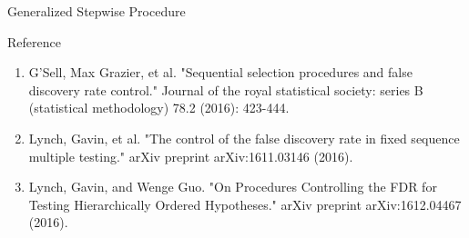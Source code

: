 \documentclass{beamer}
\begin{document}
\begin{frame}[t]{Generalized Stepwise Procedure}\vspace{10pt}

\end{frame}


\begin{frame}[t]{Reference}\vspace{10pt}

\begin{enumerate}
	\item G'Sell, Max Grazier, et al. "Sequential selection procedures and false discovery rate control." Journal of the royal statistical society: series B (statistical methodology) 78.2 (2016): 423-444.
	\item Lynch, Gavin, et al. "The control of the false discovery rate in fixed sequence multiple testing." arXiv preprint arXiv:1611.03146 (2016).
	\item Lynch, Gavin, and Wenge Guo. "On Procedures Controlling the FDR for Testing Hierarchically Ordered Hypotheses." arXiv preprint arXiv:1612.04467 (2016).
\end{enumerate}

\end{frame}
\end{document}
